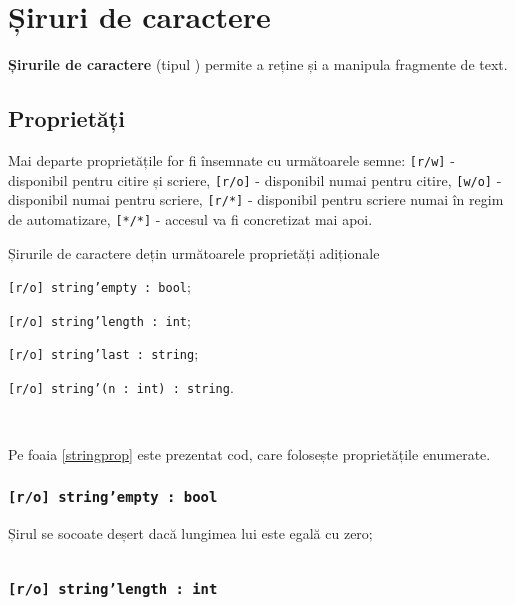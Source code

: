 \section{Șiruri de caractere}

{\bf Șirurile de caractere} (tipul \str{}) permite a reține și a manipula fragmente de text. 

\subsection{Proprietăți}

Mai departe proprietățile for fi însemnate cu următoarele semne: \texttt{[r/w]} - disponibil pentru citire și scriere, \texttt{[r/o]} - disponibil numai pentru citire, \texttt{[w/o]} - disponibil numai pentru scriere,  \texttt{[r/*]} - disponibil pentru scriere numai în regim de automatizare, \texttt{[*/*]} - accesul va fi concretizat mai apoi.

Șirurile de caractere dețin următoarele proprietăți adiționale
\begin{icItems}
\item
	\texttt{[r/o] string'empty : bool};
\item
	\texttt{[r/o] string'length : int};
\item
	\texttt{[r/o] string'last : string};
\item
	\texttt{[r/o] string'(n : int) : string}.
\end{icItems}

\

Pe foaia \ref{stringprop} este prezentat cod, care folosește proprietățile enumerate.

\subsubsection{\texttt{[r/o] string'empty : bool}}

Șirul se socoate deșert dacă lungimea lui este egală cu zero;

\begin{sourcecode}
    \label{stringprop}
    \inputminted[linenos]{icl}{../sources/stringprop.icL}
\end{sourcecode}

\subsubsection{\texttt{[r/o] string'length : int}}

